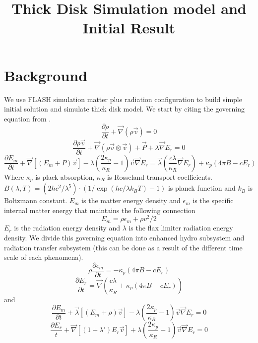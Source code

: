 \documentclass[12pt, a4paper]{article}
\title{Thick Disk Simulation model and Initial Result}
\begin{document}
\section{Background}
We use FLASH simulation \cite{2000ApJS..131..273F} matter plus radiation configuration to build simple initial solution and simulate thick disk model.
We start by citing the governing equation from \cite{2019ApJ...876..148C}.
\begin{equation}
    \frac{\partial \rho}{\partial t} + \vec \nabla(\rho\vec v)=0
\end{equation}
\begin{equation}
    \frac{\partial \rho \vec v}{\partial t}+\vec\nabla(\rho\vec v\otimes\vec v)+\vec P+\lambda\vec\nabla E_r=0
\end{equation}
\begin{equation}
    \frac{\partial E_m}{\partial t}+\vec\nabla[(E_m+P)\vec v]-\lambda(\frac{2\kappa_p}{\kappa_R}-1)\vec v \vec\nabla E_r = 
        \vec\lambda(\frac{c\lambda}{\kappa_R}\vec\nabla E_r)+\kappa_p(4\pi B-cE_r)
\end{equation}
Where $\kappa_p$ is plack absorption, $\kappa_R$ is Rosseland transport coefficients.
$B(\lambda,T)=(2hc^2/\lambda^5)\cdot(1/\exp(hc/\lambda k_B T)-1 )$ is planck function and $k_B$ is Boltzmann constant.
$E_m$ is the matter energy density and $\epsilon_m$ is the specific internal matter energy that maintains the following connection
\begin{equation}
    E_m=\rho\epsilon_m+\rho v^2/2
\end{equation}
$E_r$ is the radiation energy density and $\lambda$ is the flax limiter radiation energy density.
We divide this governing equation into enhanced hydro subsystem and radiation transfer subsystem (this can be done as a result of the different time scale of each phenomena).
\begin{equation}
    \rho\frac{\partial \epsilon_m}{\partial t} = -\kappa_p(4\pi B-c E_r)
\end{equation}
\begin{equation}
    \frac{\partial E_r}{\partial t} = \vec\nabla(\frac{c\lambda}{\kappa_R}+\kappa_p(4\pi B-c E_r))
\end{equation}
and
\begin{equation}
    \frac{\partial E_m}{\partial t}+\vec\lambda[(E_m+\rho)\vec v]-\lambda(\frac{2\kappa_p}{\kappa_R}-1)\vec v \vec \nabla E_r =0
\end{equation}
\begin{equation}
    \frac{\partial E_r}{t}+\vec \nabla[(1+\lambda')E_r\vec v]+\lambda(\frac{2\kappa_p}{\kappa_R}-1)\vec v \vec \nabla E_r =0
\end{equation}
\end{document}
